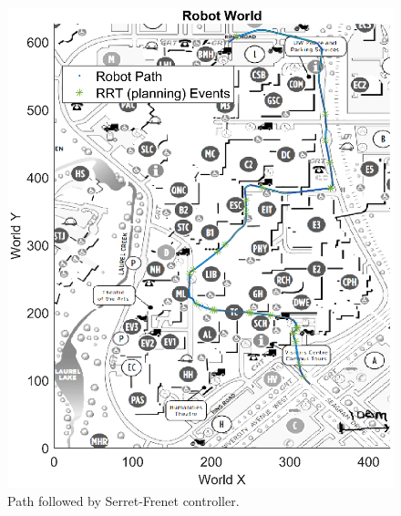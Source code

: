\begin{figure}[!htbp]
    \centering
    \includegraphics{images/campus_serret_frenet.eps}
    \caption{Path followed by Serret-Frenet controller.}
    \label{fig:mock_campus_serret_frenet}
\end{figure}

